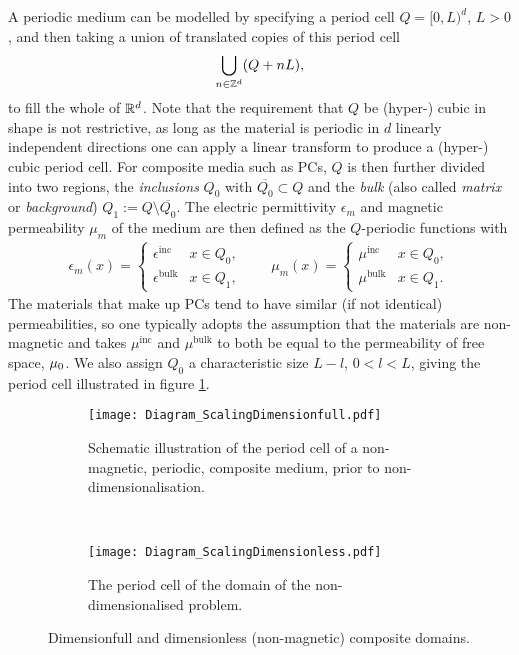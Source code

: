 A periodic medium can be modelled by specifying a period cell $Q=[0,L)^d$, $L>0$, and then taking a union of translated copies of this period cell
\begin{align*}
	\bigcup_{n\in\mathbb{Z}^d} (Q + nL),
\end{align*}
to fill the whole of $\mathbb{R}^d$.
Note that the requirement that $Q$ be (hyper-) cubic in shape is not restrictive, as long as the material is periodic in $d$ linearly independent directions one can apply a linear transform to produce a (hyper-) cubic period cell.
For composite media such as PCs, $Q$ is then further divided into two regions, the \emph{inclusions} $Q_0$ with $\overline{Q_0}\subset Q$ and the \emph{bulk} (also called \emph{matrix} or \emph{background}) $Q_1:=Q\setminus \overline{Q_0}$.
The electric permittivity $\epsilon_m$ and magnetic permeability $\mu_m$ of the medium are then defined as the $Q$-periodic functions with
\begin{align*}
	\epsilon_m(x) = \begin{cases} \epsilon^{\mathrm{inc}} & x\in Q_0, \\ \epsilon^{\mathrm{bulk}} & x\in Q_1, \end{cases}
	\qquad
	\mu_m(x) = \begin{cases} \mu^{\mathrm{inc}} & x\in Q_0, \\ \mu^{\mathrm{bulk}} & x\in Q_1. \end{cases}
\end{align*}
The materials that make up PCs tend to have similar (if not identical) permeabilities, so one typically adopts the assumption that the materials are non-magnetic and takes $\mu^{\mathrm{inc}}$ and $\mu^{\mathrm{bulk}}$ to both be equal to the permeability of free space, $\mu_0$.
We also assign $Q_0$ a characteristic size $L-l$, $0<l<L$, giving the period cell illustrated in figure \ref{fig:Diagram_ScalingDimensionfull}.
\begin{figure}[b!]
	\centering
	\begin{subfigure}[t]{0.45\textwidth}
		\centering
		\texttt{[image: Diagram\_ScalingDimensionfull.pdf]}
		\caption{\label{fig:Diagram_ScalingDimensionfull} Schematic illustration of the period cell of a non-magnetic, periodic, composite medium, prior to non-dimensionalisation.}
	\end{subfigure}
	~
	\begin{subfigure}[t]{0.45\textwidth}
		\centering
		\texttt{[image: Diagram\_ScalingDimensionless.pdf]}
		\caption[Illustration of the relationship between physical properties and dimensionless parameters for composite media.]{\label{fig:Diagram_ScalingDimensionless} The period cell of the domain of the non-dimensionalised problem.}
	\end{subfigure}
	\caption[Dimensionfull and dimensionless (non-magnetic) composite domains.]{\label{fig:Diagram_ScalingND} Dimensionfull and dimensionless (non-magnetic) composite domains.}
\end{figure}

